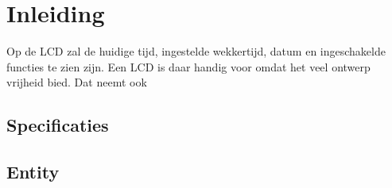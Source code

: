 \chapter{Inleiding}
Op de LCD zal de huidige tijd, ingestelde wekkertijd, datum en ingeschakelde functies te zien zijn. Een LCD is daar handig voor omdat het veel ontwerp vrijheid bied. Dat neemt ook 
\section{Specificaties}

\section{Entity}

